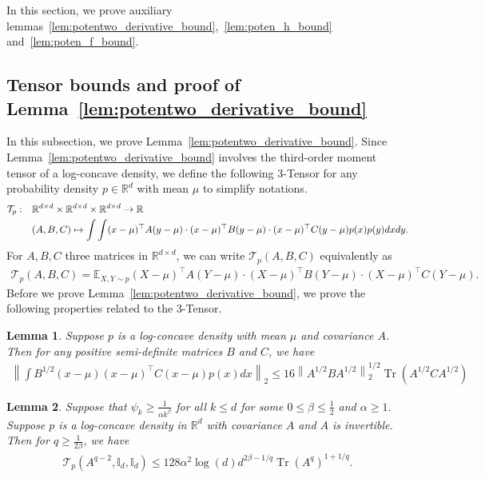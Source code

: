 \documentclass[11pt,twoside]{article}
\newcommand{\ttensor}{\mathcal{T}}
\newcommand{\isoperi}{\psi}
\theoremstyle{named}
\theoremstyle{plain}
\newtheorem{lemma}{Lemma}
\newcommand{\vecnorm}[2]{\left\| #1\right\|_{#2}}
\newcommand{\Exs}{\ensuremath{{\mathbb{E}}}}
\newcommand{\usedim}{\ensuremath{d}}
\newcommand{\dims}{\usedim}
\DeclareMathOperator{\trace}{Tr}
\newcommand{\Ind}{\ensuremath{\mathbb{I}}}
\newcommand{\real}{\ensuremath{\mathbb{R}}}
\newcommand{\parenth}[1]{\left( #1 \right)}
\newcommand{\tp}{^\top}
\begin{document}
In this section, we prove auxiliary lemmas~\ref{lem:potentwo_derivative_bound},~\ref{lem:poten_h_bound} and~\ref{lem:poten_f_bound}.

\subsection{Tensor bounds and proof of Lemma~\ref{lem:potentwo_derivative_bound}} %
\label{sub:tensor_bounds}
In this subsection, we prove Lemma~\ref{lem:potentwo_derivative_bound}. Since Lemma~\ref{lem:potentwo_derivative_bound} involves the third-order moment tensor of a log-concave density, we define the following 3-Tensor for any probability density $p \in \real^\dims$ with mean $\mu$ to simplify notations.
\begin{align}
  \label{def:ttensor}
  \ttensor_p: \quad
  &\real^{\dims \times \dims} \times \real^{\dims \times \dims} \times \real^{\dims \times \dims} \rightarrow \real \notag \\
  &(A, B, C) \mapsto \int \int (x-\mu)\tp A (y-\mu) \cdot (x-\mu)\tp B (y - \mu) \cdot (x - \mu) \tp C (y - \mu) p(x) p(y) dx dy.
\end{align}
For $A, B, C$ three matrices in $\real^{\dims \times \dims}$, we can write $\ttensor_p(A, B, C)$ equivalently as
\begin{align*}
  \ttensor_p(A, B, C) = \Exs_{X, Y \sim p} (X-\mu) \tp A (Y-\mu) \cdot (X-\mu) \tp B (Y-\mu) \cdot (X-\mu) \tp C (Y-\mu).
\end{align*}
Before we prove Lemma~\ref{lem:potentwo_derivative_bound}, we prove the following properties related to the 3-Tensor.
\begin{lemma}
  \label{lem:tensor_vector_bound}
  Suppose $p$ is a log-concave density with mean $\mu$ and covariance $A$. Then for any positive semi-definite matrices $B$ and $C$, we have
  \begin{align*}
    \vecnorm{\int B^{1/2} (x - \mu) (x - \mu) \tp C (x - \mu) p(x)dx}{2} \leq 16 \vecnorm{A^{1/2}B A^{1/2}}{2}^{1/2} \trace\parenth{A^{1/2} C A^{1/2}}
  \end{align*}
\end{lemma}

\begin{lemma}
  \label{lem:ttensor_A_isoperimetric_bound}
  Suppose that $\isoperi_k \geq \frac{1}{\alpha k^\beta}$ for all $k \leq \dims$ for some $0 \leq \beta \leq \frac{1}{2}$ and $\alpha \geq 1$. Suppose $p$ is a log-concave density in $\real^\dims$ with covariance $A$ and $A$ is invertible. Then for $q \geq \frac{1}{2\beta}$, we have
  \begin{align*}
    \ttensor_p(A^{q-2}, \Ind_\dims, \Ind_\dims) \leq 128 \alpha^2 \log(\dims) \dims^{2\beta - 1/q} \trace(A^q) ^{1 + 1/q}.
  \end{align*}
\end{lemma}
\end{document}
